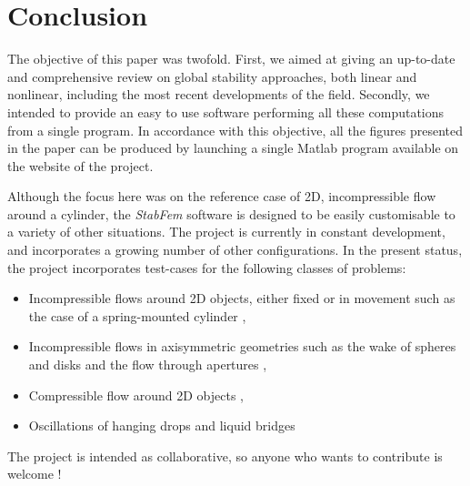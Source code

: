 \documentclass[twocolumn,10pt]{asme2ej}
\begin{document}

\section{Conclusion}


The objective of this paper was twofold. First, we aimed at giving an up-to-date and comprehensive review on global stability approaches, both linear and nonlinear, including the most recent developments of the field. 
Secondly, we intended to provide an easy to use software performing all these computations from a single program. In accordance with this objective, all the figures presented in the paper can be produced by launching a single Matlab program available on the website of the project.

Although the focus here was on the reference case of 2D, incompressible flow around a cylinder, the  {\em StabFem } software is designed to be easily customisable to a variety of other situations. The project is currently in constant development, and incorporates a growing number of other configurations. In the present status, the project incorporates test-cases for the following classes of problems:
\begin{itemize}
\item Incompressible flows around 2D objects, either fixed or in movement such as the case of a spring-mounted cylinder \cite{Navrose},
\item Incompressible flows in axisymmetric geometries such as the wake of spheres and disks \cite{Tchoufag2015} and the flow through apertures \cite{FabreISMA}, 
\item Compressible flow around 2D objects  \cite{Fani2018}, 
\item Oscillations of hanging drops and liquid bridges \cite{Chireux2015}
\end{itemize}
The project is intended as collaborative, so anyone who wants to contribute is welcome !





\end{document}
